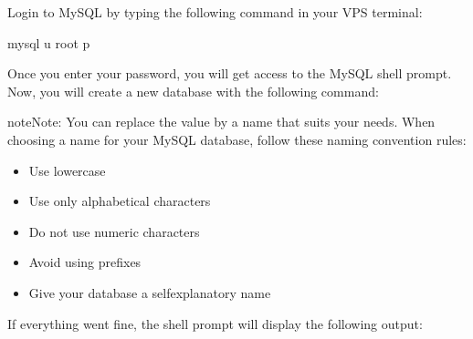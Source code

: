 \documentclass[a4paper,10pt,english,openany,oneside]{sphinxmanual}
\begin{document}
\begin{sloppypar}
\sphinxAtStartPar
Login to MySQL by typing the following command in your VPS terminal:

\begin{sphinxVerbatim}[commandchars=\\\{\}]
\PYGZdl{} mysql \PYGZhy{}u root \PYGZhy{}p
\end{sphinxVerbatim}

\sphinxAtStartPar
Once you enter your password, you will get access to the MySQL shell prompt. Now, you will create a new database with the following command:

\begin{sphinxVerbatim}[commandchars=\\\{\}]
\end{sphinxVerbatim}

\begin{sphinxadmonition}{note}{Note:}
\sphinxAtStartPar
You can replace the value  by a name that suits your needs. When choosing a name for your MySQL database, follow these naming convention rules:
\begin{itemize}
\item {} 
\sphinxAtStartPar
Use lowercase

\item {} 
\sphinxAtStartPar
Use only alphabetical characters

\item {} 
\sphinxAtStartPar
Do not use numeric characters

\item {} 
\sphinxAtStartPar
Avoid using prefixes

\item {} 
\sphinxAtStartPar
Give your database a self\sphinxhyphen{}explanatory name

\end{itemize}
\end{sphinxadmonition}

\sphinxAtStartPar
If everything went fine, the shell prompt will display the following output:

\begin{sphinxVerbatim}[commandchars=\\\{\},numbers=left,firstnumber=1,stepnumber=1]
\end{sphinxVerbatim}



\end{sloppypar}
\end{document}
